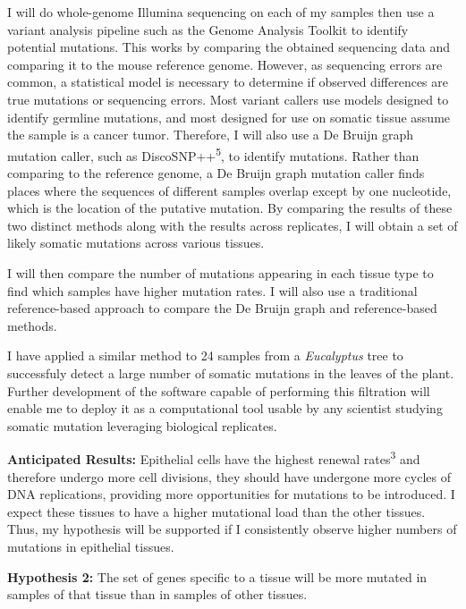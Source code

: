\documentclass[12pt]{article}
\begin{document}
I will do whole-genome Illumina sequencing on each of my samples then use a variant analysis pipeline such as the Genome Analysis Toolkit to identify potential mutations.
This works by comparing the obtained sequencing data and comparing it to the mouse reference genome.
However, as sequencing errors are common, a statistical model is necessary to determine if observed differences are true mutations or sequencing errors.
Most variant callers use models designed to identify germline mutations, and most designed for use on somatic tissue assume the sample is a cancer tumor.
Therefore, I will also use a De Bruijn graph mutation caller, such as DiscoSNP++\textsuperscript{5}, to identify mutations.
Rather than comparing to the reference genome, a De Bruijn graph mutation caller finds places where the sequences of different samples overlap except by one nucleotide, which is the location of the putative mutation.
By comparing the results of these two distinct methods along with the results across replicates, I will obtain a set of likely somatic mutations across various tissues.

I will then compare the number of mutations appearing in each tissue type to find which samples have higher mutation rates.
I will also use a traditional reference-based approach to compare the De Bruijn graph and reference-based methods. %

I have applied a similar method to 24 samples from a \textit{Eucalyptus} tree to successfuly detect a large number of somatic mutations in the leaves of the plant. Further development of the software capable of performing this filtration will enable me to deploy it as a computational tool usable by any scientist studying somatic mutation leveraging biological replicates.

\textbf{Anticipated Results:}
Epithelial cells have the highest renewal rates\textsuperscript{3} and therefore undergo more cell divisions, they should have undergone more cycles of DNA replications, providing more opportunities for mutations to be introduced.
I expect these tissues to have a higher mutational load than the other tissues.
Thus, my hypothesis will be supported if I consistently observe higher numbers of mutations in epithelial tissues.

\textbf{Hypothesis 2:}
The set of genes specific to a tissue will be more mutated in samples of that tissue than in samples of other tissues.
\end{document}
